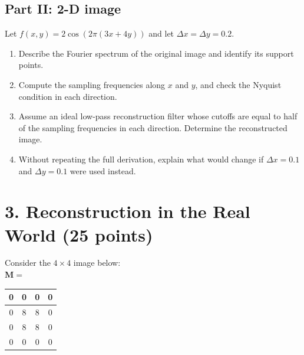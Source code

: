 \subsection*{Part II: 2-D image}
Let $f(x, y) = 2 \cos(2\pi(3x + 4y))$ and let $\Delta x = \Delta y = 0.2$.

\begin{enumerate}
    \item[\textbf{(e)}] Describe the Fourier spectrum of the original image and identify its support points.
    \item[\textbf{(f)}] Compute the sampling frequencies along $x$ and $y$, and check the Nyquist condition in each direction.
    \item[\textbf{(g)}] Assume an ideal low-pass reconstruction filter whose cutoffs are equal to half of the sampling frequencies in each direction. Determine the reconstructed image.
    \item[\textbf{(h)}] Without repeating the full derivation, explain what would change if $\Delta x = 0.1$ and $\Delta y = 0.1$ were used instead.
\end{enumerate}

\section*{3. Reconstruction in the Real World (25 points)}

Consider the $4\times 4$ image below:\\
$\mathbf{M} =$
\begin{center}
    \begin{tabular}{|c|c|c|c|}
    \hline
    0 & 0 & 0 & 0 \\
    \hline
    0 & 8 & 8 & 0 \\
    \hline
    0 & 8 & 8 & 0 \\
    \hline
    0 & 0 & 0 & 0 \\
    \hline
    \end{tabular}
\end{center}

